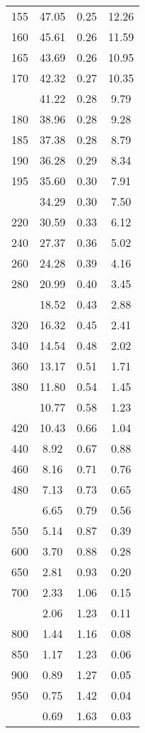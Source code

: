 \begin{table}[ht]
\begin{tabular}{lccc}
  155 & 47.05 & 0.25 & 12.26 \\ 
  160 & 45.61 & 0.26 & 11.59 \\ 
  165 & 43.69 & 0.26 & 10.95 \\ 
  170 & 42.32 & 0.27 & 10.35 \\ 
   \addlinespace
175 & 41.22 & 0.28 & 9.79 \\ 
  180 & 38.96 & 0.28 & 9.28 \\ 
  185 & 37.38 & 0.28 & 8.79 \\ 
  190 & 36.28 & 0.29 & 8.34 \\ 
  195 & 35.60 & 0.30 & 7.91 \\ 
   \addlinespace
200 & 34.29 & 0.30 & 7.50 \\ 
  220 & 30.59 & 0.33 & 6.12 \\ 
  240 & 27.37 & 0.36 & 5.02 \\ 
  260 & 24.28 & 0.39 & 4.16 \\ 
  280 & 20.99 & 0.40 & 3.45 \\ 
   \addlinespace
300 & 18.52 & 0.43 & 2.88 \\ 
  320 & 16.32 & 0.45 & 2.41 \\ 
  340 & 14.54 & 0.48 & 2.02 \\ 
  360 & 13.17 & 0.51 & 1.71 \\ 
  380 & 11.80 & 0.54 & 1.45 \\ 
   \addlinespace
400 & 10.77 & 0.58 & 1.23 \\ 
  420 & 10.43 & 0.66 & 1.04 \\ 
  440 & 8.92 & 0.67 & 0.88 \\ 
  460 & 8.16 & 0.71 & 0.76 \\ 
  480 & 7.13 & 0.73 & 0.65 \\ 
   \addlinespace
500 & 6.65 & 0.79 & 0.56 \\ 
  550 & 5.14 & 0.87 & 0.39 \\ 
  600 & 3.70 & 0.88 & 0.28 \\ 
  650 & 2.81 & 0.93 & 0.20 \\ 
  700 & 2.33 & 1.06 & 0.15 \\ 
   \addlinespace
750 & 2.06 & 1.23 & 0.11 \\ 
  800 & 1.44 & 1.16 & 0.08 \\ 
  850 & 1.17 & 1.23 & 0.06 \\ 
  900 & 0.89 & 1.27 & 0.05 \\ 
  950 & 0.75 & 1.42 & 0.04 \\ 
   \addlinespace
1000 & 0.69 & 1.63 & 0.03 \\ 
   \bottomrule
\end{tabular}
\end{table}
